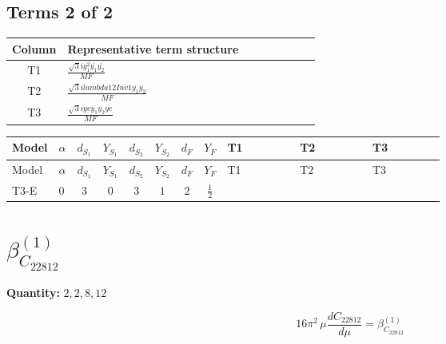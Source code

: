 \documentclass[8pt]{article}
\begin{document}
\begin{landscape}
\subsection*{Terms 2 of 2}
\begin{center}
\begin{tabular}{@{}c >{\raggedright\arraybackslash}p{0.82\linewidth}@{}}
\toprule
Column & Representative term structure \\
\midrule
T1 & \(\displaystyle \frac{\sqrt{3} i g_{1}^{2} \overline{y_{1}} \overline{y_{2}}}{MF}\) \\
\midrule
T2 & \(\displaystyle \frac{\sqrt{3} i lambda12Inv1 \overline{y_{1}} \overline{y_{2}}}{MF}\) \\
\midrule
T3 & \(\displaystyle \frac{\sqrt{3} i ye \overline{y_{1}} \overline{y_{2}} \overline{ye}}{MF}\) \\
\midrule
\bottomrule
\end{tabular}
\end{center}
\smallskip
\tiny
\begin{longtable}{@{}llcccccc >{\raggedright\arraybackslash}p{0.21\linewidth} >{\raggedright\arraybackslash}p{0.21\linewidth} >{\raggedright\arraybackslash}p{0.21\linewidth}@{}}
\toprule
Model & $\alpha$ & $d_{S_1}$ & $Y_{S_1}$ & $d_{S_2}$ & $Y_{S_2}$ & $d_F$ & $Y_F$ & T1 & T2 & T3 \\
\midrule
\endfirsthead
\toprule
Model & $\alpha$ & $d_{S_1}$ & $Y_{S_1}$ & $d_{S_2}$ & $Y_{S_2}$ & $d_F$ & $Y_F$ & T1 & T2 & T3 \\
\midrule
\endhead
T3-E & $0$ & $3$ & $0$ & $3$ & $1$ & $2$ & $\frac{1}{2}$ & \scriptsize\adjustbox{max width=\linewidth}{$\begin{gathered} - \frac{\sqrt{3} i g_{1}^{2} \overline{y_{1}} \overline{y_{2}}}{8 MF}\end{gathered}$} & \scriptsize\adjustbox{max width=\linewidth}{$\begin{gathered} \frac{\sqrt{3} i lambda12Inv1 \overline{y_{1}} \overline{y_{2}}}{6 MF}\end{gathered}$} & \scriptsize\adjustbox{max width=\linewidth}{$\begin{gathered} \frac{\sqrt{3} i ye \overline{y_{1}} \overline{y_{2}} \overline{ye}}{12 MF}\end{gathered}$} \\
\midrule
\bottomrule
\end{longtable}
\clearpage
\section*{$\beta_{C_{22812}}^{(1)}$}
\noindent\textbf{Quantity: }$\mathrm{2,2,8,12}$\par\smallskip
\[16\pi^2\,\mu\frac{d C_{22812}}{d\mu}=\beta_{C_{22812}}^{(1)}\]

\end{landscape}
\end{document}
